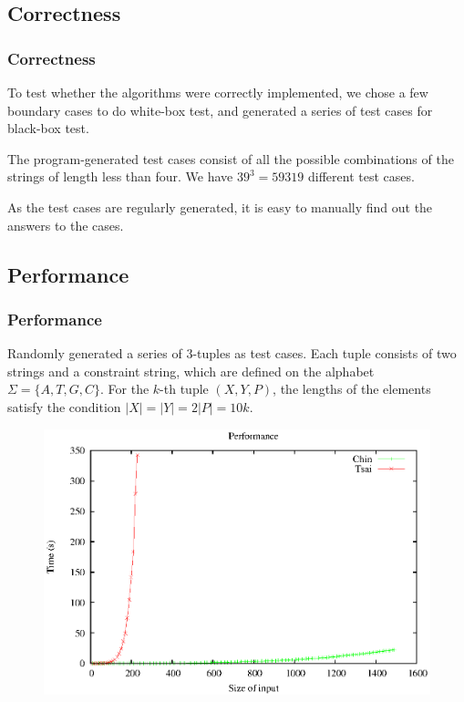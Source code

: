 \documentclass[10pt]{beamer}
\begin{document}
\subsection{Correctness}
\begin{frame}
  \frametitle{Correctness}
To test whether the algorithms were correctly implemented, we chose a few boundary cases to do white-box test, and generated a series of test cases for black-box test.

  \medskip
  \medskip

The program-generated test cases consist of all the possible combinations of the strings of length less than four. We have $39^3=59319$ different test cases. 

  \medskip
  \medskip

As the test cases are regularly generated, it is easy to manually find out the answers to the cases. 

\end{frame}

\subsection{Performance}
\begin{frame}
  \frametitle{Performance}
Randomly generated a series of 3-tuples as test cases. Each tuple consists of two strings and a constraint string, which are defined on the alphabet $\Sigma=\{A,T,G,C\}$. 
For the $k$-th tuple $(X,Y,P)$, the lengths of the elements satisfy the condition $|X|=|Y|=2|P| = 10k$. 
\begin{center}
\begin{figure}[ht]
	\centering
	\includegraphics[scale=0.55]{images/experiment.eps}
\end{figure}
\end{center}
\end{frame}
\end{document}
